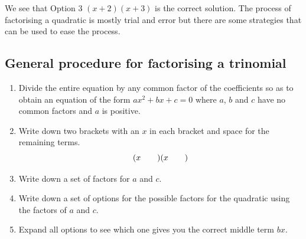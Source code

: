 \par
We see that Option 3 $(x+2)(x+3)$ is the correct solution. The process of factorising a quadratic is mostly trial and error but there are some strategies that can be used to ease the process.\par 



\subsection*{General procedure for factorising a trinomial}

\begin{enumerate}[itemsep=5pt, label=\textbf{\arabic*}. ] 
\item Divide the entire equation by any common factor of the coefficients so as to obtain an equation of the form $a{x}^{2}+bx+c=0$ where $a$, $b$ and $c$ have no common factors and $a$ is positive.
\item Write down two brackets with an $x$ in each bracket and space for the remaining terms.
\begin{equation*}
(x\phantom{\rule{2.em}{0ex}})(x\phantom{\rule{2.em}{0ex}})
\end{equation*}

\item Write down a set of factors for $a$ and $c$.
\item Write down a set of options for the possible factors for the quadratic using the factors of $a$ and $c$.
\item Expand all options to see which one gives you the correct middle term $bx$.
\end{enumerate}

